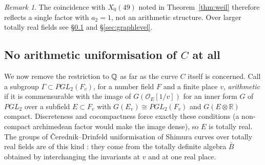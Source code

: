 \documentclass[11pt]{amsart}
\numberwithin{equation}{section}
\theoremstyle{plain}
\theoremstyle{definition}\newtheorem{definition}[theorem]{Definition}
\theoremstyle{remark}\newtheorem{remark}[theorem]{Remark}
\begin{document}
\begin{remark}
The coincidence with $X_0(49)$ noted in Theorem~\ref{thm:weil} therefore reflects a single factor with $a_2=1$, not an arithmetic structure. Over larger totally real fields see \S\ref{sec:noarith} and \S\ref{sec:graphlevel}.
\end{remark}

\subsection{\texorpdfstring{No arithmetic uniformisation of $C$ at all}{No arithmetic uniformisation of C at all}}\label{sec:noarith}
We now remove the restriction to $\mathbb{Q}$ as far as the curve $C$ itself is concerned. Call a subgroup $\Gamma\subset PGL_2(F_v)$, for a number field $F$ and a finite place $v$, \emph{arithmetic} if it is commensurable with the image of $G(\mathcal O_E[1/v])$ for an inner form $G$ of $PGL_2$ over a subfield $E\subset F_v$ with $G(E_v)\cong PGL_2(F_v)$ and $G(E\otimes\mathbb R)$ compact. Discreteness and cocompactness force exactly these conditions (a non-compact archimedean factor would make the image dense), so $E$ is totally real. The groups of \v{C}erednik--Drinfeld uniformisation of Shimura curves over totally real fields are of this kind \cite{cerednik76,drinfeld76}: they come from the totally definite algebra $\bar B$ obtained by interchanging the invariants at $v$ and at one real place.
\end{document}
